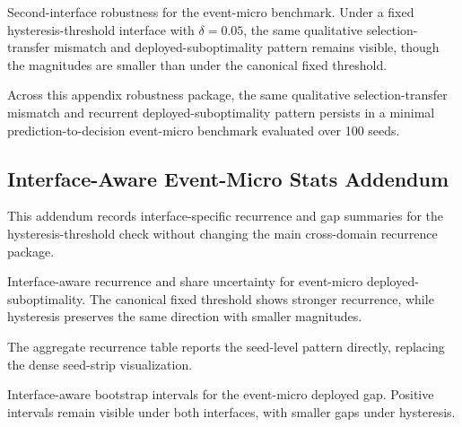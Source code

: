 \documentclass{article}
\begin{document}
\begin{table}[!htbp]
\centering
\scriptsize
\setlength{\tabcolsep}{2.5pt}
\begin{adjustbox}{width=\appwidetablewidth}

\end{adjustbox}
\caption{Second-interface robustness for the event-micro benchmark. Under a fixed hysteresis-threshold interface with $\delta = 0.05$, the same qualitative selection-transfer mismatch and deployed-suboptimality pattern remains visible, though the magnitudes are smaller than under the canonical fixed threshold.}
\label{tab:event-micro-hysteresis-robustness}
\end{table}

Across this appendix robustness package, the same qualitative selection-transfer mismatch and recurrent deployed-suboptimality pattern persists in a minimal prediction-to-decision event-micro benchmark evaluated over 100 seeds.

\subsection{Interface-Aware Event-Micro Stats Addendum}
\label{app:event-micro-interface-stats}

This addendum records interface-specific recurrence and gap summaries for the hysteresis-threshold check without changing the main cross-domain recurrence package.

\begin{table}[!htbp]
\centering
\begin{minipage}{\appmidtablewidth}
\centering
\scriptsize
\setlength{\tabcolsep}{2.5pt}
\begin{adjustbox}{width=\linewidth}

\end{adjustbox}
\caption{Interface-aware recurrence and share uncertainty for event-micro deployed-suboptimality. The canonical fixed threshold shows stronger recurrence, while hysteresis preserves the same direction with smaller magnitudes.}
\label{tab:event-micro-interface-recurrence-tests}
\end{minipage}
\end{table}

The aggregate recurrence table reports the seed-level pattern directly, replacing the dense seed-strip visualization.

\begin{table}[!htbp]
\centering
\scriptsize
\setlength{\tabcolsep}{2.5pt}
\begin{adjustbox}{width=\appwidetablewidth}

\end{adjustbox}
\caption{Interface-aware bootstrap intervals for the event-micro deployed gap. Positive intervals remain visible under both interfaces, with smaller gaps under hysteresis.}
\label{tab:event-micro-interface-gap-bootstrap-cis}
\end{table}
\end{document}
